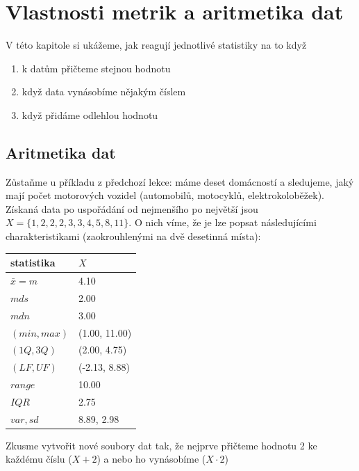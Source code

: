 \documentclass[
  czech,
  11pt,
  letterpaper,
  DIV=11,
  numbers=noendperiod]{scrreprt}
\newcounter{none} %
\providecommand{\tightlist}{%
  \setlength{\itemsep}{0pt}\setlength{\parskip}{0pt}}
\begin{document}
\chapter{Vlastnosti metrik a aritmetika
dat}\label{vlastnosti-metrik-a-aritmetika-dat}

V této kapitole si ukážeme, jak reagují jednotlivé statistiky na to když

\begin{enumerate}
\def\labelenumi{\arabic{enumi}.}
\tightlist
\item
  k datům přičteme stejnou hodnotu
\item
  když data vynásobíme nějakým číslem
\item
  když přidáme odlehlou hodnotu
\end{enumerate}

\section{Aritmetika dat}\label{aritmetika-dat}

Zůstaňme u příkladu z předchozí lekce: máme deset domácností a
sledujeme, jaký mají počet motorových vozidel (automobilů, motocyklů,
elektrokoloběžek). Získaná data po uspořádání od nejmenšího po největší
jsou \(X=\{1, 2, 2, 2, 3, 3, 4, 5, 8, 11\}\). O nich víme, že je lze
popsat následujícími charakteristikami (zaokrouhlenými na dvě desetinná
místa):

{\def\LTcaptype{none} %
\begin{longtable}[]{@{}ll@{}}
\toprule\noalign{}
statistika & \(X\) \\
\midrule\noalign{}
\endhead
\bottomrule\noalign{}
\endlastfoot
\(\bar{x}=m\) & 4.10 \\
\(mds\) & 2.00 \\
\(mdn\) & 3.00 \\
\((min, max)\) & (1.00, 11.00) \\
\((1Q, 3Q)\) & (2.00, 4.75) \\
\((LF, UF)\) & (-2.13, 8.88) \\
\(range\) & 10.00 \\
\(IQR\) & 2.75 \\
\(var, sd\) & 8.89, 2.98 \\
\end{longtable}
}

Zkusme vytvořit nové soubory dat tak, že nejprve přičteme hodnotu 2 ke
každému číslu (\(X+2\)) a nebo ho vynásobíme (\(X\cdot 2\))
\end{document}
